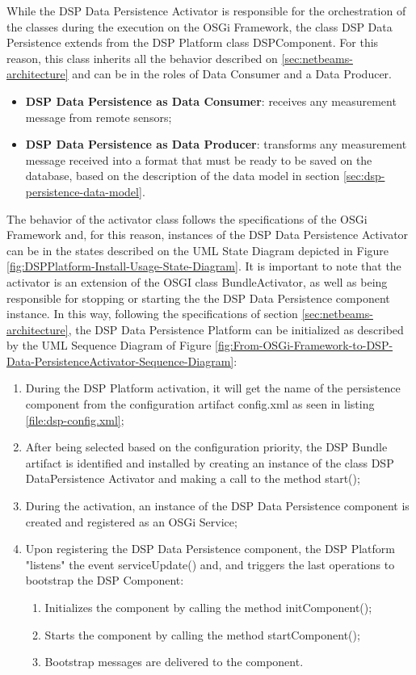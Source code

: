 While the DSP Data Persistence Activator is responsible for the orchestration
of the classes during the execution on the OSGi Framework, the class DSP Data
Persistence extends from the DSP Platform class DSPComponent. For this reason,
this class inherits all the behavior described on \ref{sec:netbeams-architecture}
and can be in the roles of Data Consumer and a Data Producer.

\begin{itemize}
  \item \textbf{DSP Data Persistence as Data Consumer}: receives any measurement
  message from remote sensors;
  \item \textbf{DSP Data Persistence as Data Producer}: transforms any
  measurement message received into a format that must be ready to be saved on the
  database, based on the description of the data model in section
  \ref{sec:dsp-persistence-data-model}.
\end{itemize}

The behavior of the activator class follows the specifications of the
OSGi Framework and, for this reason, instances of the DSP Data Persistence
Activator can be in the states described on the UML State Diagram depicted in
Figure \ref{fig:DSPPlatform-Install-Usage-State-Diagram}. It is important to
note that the activator is an extension of the OSGI class BundleActivator, as
well as being responsible for stopping or starting the the DSP Data Persistence
component instance. In this way, following the specifications of section
\ref{sec:netbeams-architecture}, the DSP Data Persistence Platform can be
initialized as described by the UML Sequence Diagram of Figure
\ref{fig:From-OSGi-Framework-to-DSP-Data-PersistenceActivator-Sequence-Diagram}:

\begin{enumerate}
  \item During the DSP Platform activation, it will get the name of the
  persistence component from the configuration artifact config.xml as seen in
  listing \ref{file:dsp-config.xml};
  \item After being selected based on the configuration priority, the DSP
  Bundle artifact is identified and installed by creating an instance of the
  class DSP DataPersistence Activator and making a call to the method start();
  \item During the activation, an instance of the DSP Data Persistence
  component is created and registered as an OSGi Service;
  \item Upon registering the DSP Data Persistence component, the DSP Platform
  "listens" the event serviceUpdate() and, and triggers the last operations to
  bootstrap the DSP Component:
   \begin{enumerate}
      \item Initializes the component by calling the method initComponent();
      \item Starts the component by calling the method startComponent();
      \item Bootstrap messages are delivered to the component.
   \end{enumerate}
\end{enumerate}

